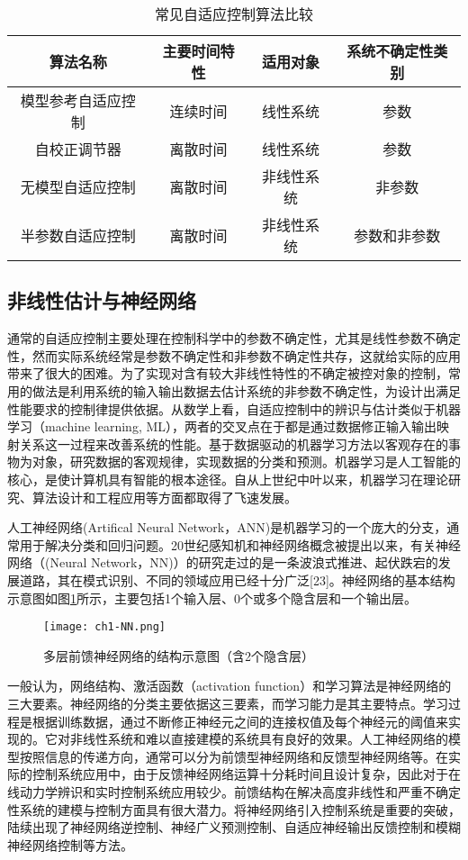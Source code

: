 \begin{table}
\centering
\caption{常见自适应控制算法比较}\label{tab:adaptive}
\begin{tabular*}{0.9\textwidth}{@{\extracolsep{\fill}}cccc}
\toprule
算法名称		&主要时间特性	&适用对象	&系统不确定性类别 \\
\midrule
模型参考自适应控制		&连续时间	&线性系统&参数\\
自校正调节器		&离散时间	& 线性系统&参数\\
无模型自适应控制		&离散时间	&非线性系统&非参数\\
半参数自适应控制		&离散时间&非线性系统	&参数和非参数\\
\bottomrule
\end{tabular*}
\end{table}

\subsection{非线性估计与神经网络}%

通常的自适应控制主要处理在控制科学中的参数不确定性，尤其是线性参数不确定性，然而实际系统经常是参数不确定性和非参数不确定性共存，这就给实际的应用带来了很大的困难。为了实现对含有较大非线性特性的不确定被控对象的控制，常用的做法是利用系统的输入输出数据去估计系统的非参数不确定性，为设计出满足性能要求的控制律提供依据。从数学上看，自适应控制中的辨识与估计类似于机器学习（machine learning, ML），两者的交叉点在于都是通过数据修正输入输出映射关系这一过程来改善系统的性能。基于数据驱动的机器学习方法以客观存在的事物为对象，研究数据的客观规律，实现数据的分类和预测。机器学习是人工智能的核心，是使计算机具有智能的根本途径。自从上世纪中叶以来，机器学习在理论研究、算法设计和工程应用等方面都取得了飞速发展。

人工神经网络(Artifical Neural Network，ANN)是机器学习的一个庞大的分支，通常用于解决分类和回归问题。20世纪感知机和神经网络概念被提出以来，有关神经网络（(Neural Network，NN)）的研究走过的是一条波浪式推进、起伏跌宕的发展道路，其在模式识别、不同的领域应用已经十分广泛[23]。神经网络的基本结构示意图如图\ref{fig:MNN}所示，主要包括1个输入层、0个或多个隐含层和一个输出层。

\begin{figure}
 \centering
 \texttt{[image: ch1-NN.png]}
 \caption{多层前馈神经网络的结构示意图（含2个隐含层）}\label{fig:MNN}
\end{figure}

一般认为，网络结构、激活函数（activation function）和学习算法是神经网络的三大要素。神经网络的分类主要依据这三要素，而学习能力是其主要特点。学习过程是根据训练数据，通过不断修正神经元之间的连接权值及每个神经元的阈值来实现的。它对非线性系统和难以直接建模的系统具有良好的效果。人工神经网络的模型按照信息的传递方向，通常可以分为前馈型神经网络和反馈型神经网络等。在实际的控制系统应用中，由于反馈神经网络运算十分耗时间且设计复杂，因此对于在线动力学辨识和实时控制系统应用较少。前馈结构在解决高度非线性和严重不确定性系统的建模与控制方面具有很大潜力。将神经网络引入控制系统是重要的突破，陆续出现了神经网络逆控制、神经广义预测控制、自适应神经输出反馈控制和模糊神经网络控制等方法。

